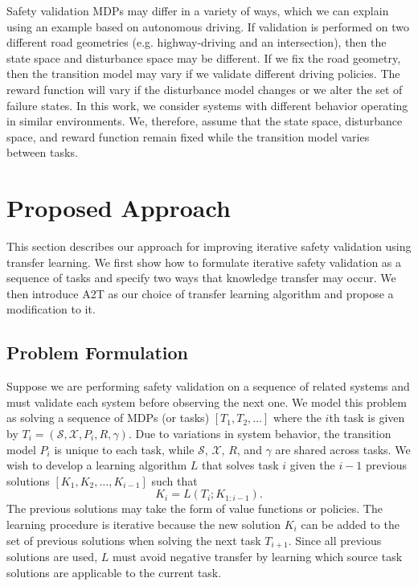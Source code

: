 Safety validation MDPs may differ in a variety of ways, which we can explain using an example based on autonomous driving. If validation is performed on two different road geometries (e.g. highway-driving  and an intersection), then the state space and disturbance space may be different. If we fix the road geometry, then the transition model may vary if we validate different driving policies. The reward function will vary if the disturbance model changes or we alter the set of failure states. In this work, we consider systems with different behavior operating in similar environments. We, therefore, assume that the state space, disturbance space, and reward function remain fixed while the transition model varies between tasks.

\section{Proposed Approach}
This section describes our approach for improving iterative safety validation using transfer learning. We first show how to formulate iterative safety validation as a sequence of tasks and specify two ways that knowledge transfer may occur. We then introduce A2T as our choice of transfer learning algorithm and propose a modification to it.

\subsection{Problem Formulation}
Suppose we are performing safety validation on a sequence of related systems and  must validate each system before observing the next one. We model this problem as solving a sequence of MDPs (or tasks) $[T_1, T_2, \ldots]$ where the $i$th task is given by $T_i = (\mathcal{S}, \mathcal{X}, P_i, R, \gamma)$. Due to variations in system behavior, the transition model $P_i$ is unique to each task, while $\mathcal{S}$, $\mathcal{X}$, $R$, and $\gamma$ are shared across tasks. We wish to develop a learning algorithm $L$ that solves task $i$ given the $i-1$ previous solutions $[K_1, K_2, \ldots, K_{i-1}]$ such that
\begin{equation}
    K_i = L(T_i; K_{1:i-1}) \text{.}
\end{equation}
The previous solutions may take the form of value functions or policies. The learning procedure is iterative because the new solution $K_i$ can be added to the set of previous solutions when solving the next task $T_{i+1}$. Since all previous solutions are used, $L$ must avoid negative transfer by learning which source task solutions are applicable to the current task.



